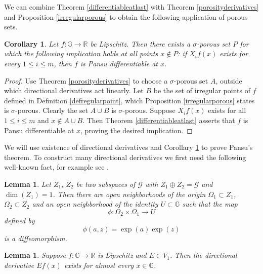 \documentclass[reqno, 11pt]{amsart}
\newtheorem{corollary}[theorem]{Corollary}
\newtheorem{lemma}[theorem]{Lemma}
\theoremstyle{definition}
\theoremstyle{remark}
\numberwithin{theorem}{section}
\numberwithin{equation}{section}
\begin{document}
We can combine Theorem \ref{differentiableatlast} with Theorem \ref{porosityderivatives} and Proposition \ref{irregularporous} to obtain the following application of porous sets.

\begin{corollary}\label{directionaltodiff}
Let $f\colon \mathbb{G}\to \mathbb{R}$ be Lipschitz. Then there exists a $\sigma$-porous set $P$ for which the following implication holds at all points $x\notin P$: if $X_{i}f(x)$ exists for every $1\leq i\leq m$, then $f$ is Pansu differentiable at $x$.
\end{corollary}

\begin{proof}
Use Theorem \ref{porosityderivatives} to choose a $\sigma$-porous set $A$, outside which directional derivatives act linearly. Let $B$ be the set of irregular points of $f$ defined in Definition \ref{defregularpoint}, which Proposition \ref{irregularporous} states is $\sigma$-porous. Clearly the set $A\cup B$ is $\sigma$-porous. Suppose $X_{i}f(x)$ exists for all $1\leq i\leq m$ and $x\notin A\cup B$. Then Theorem \ref{differentiableatlast} asserts that $f$ is Pansu differentiable at $x$, proving the desired implication.
\end{proof}

We will use existence of directional derivatives and Corollary \ref{directionaltodiff} to prove Pansu's theorem. To construct many directional derivatives we first need the following well-known fact, for example see \cite[Lemma 3.3]{Mag01}.

\begin{lemma}\label{fubinihelp}
Let $Z_{1}$, $Z_{2}$ be two subspaces of $\mathcal{G}$ with $Z_{1}\oplus Z_{2}=\mathcal{G}$ and $\dim(Z_{1})=1$. Then there are open neighborhoods of the origin $\Omega_{1}\subset Z_{1}$, $\Omega_{2}\subset Z_{2}$ and an open neighborhood of the identity $U\subset \mathbb{G}$ such that the map
\[\phi\colon \Omega_{2}\times \Omega_{1}\to U\]
defined by
\[\phi(a,z)=\exp(a)\exp(z)\]
is a diffeomorphism.
\end{lemma}

\begin{lemma}\label{directionalae}
Suppose $f\colon \mathbb{G}\to \mathbb{R}$ is Lipschitz and $E\in V_{1}$. Then the directional derivative $Ef(x)$ exists for almost every $x\in \mathbb{G}$.
\end{lemma}
\end{document}
